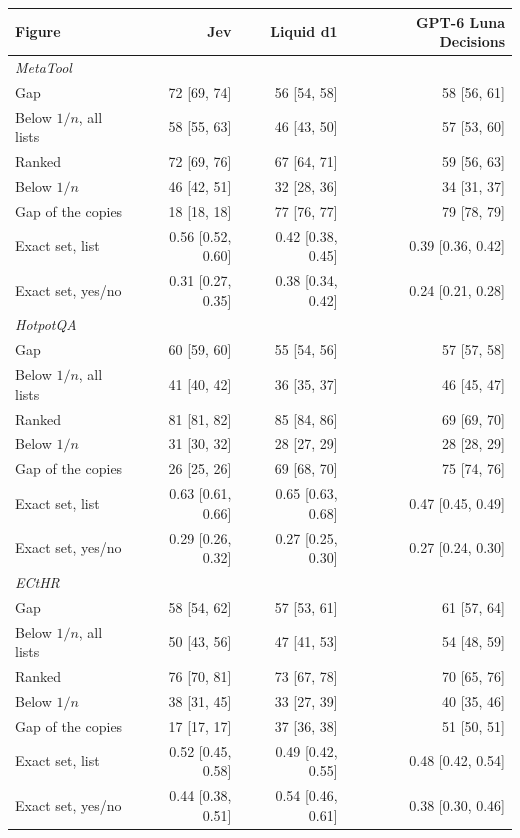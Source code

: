\begin{tabular}{lrrr}
\toprule
Figure & Jev & Liquid d1 & GPT-6 Luna Decisions \\
\midrule
\multicolumn{4}{l}{\emph{MetaTool}} \\
Gap & 72 [69, 74] & 56 [54, 58] & 58 [56, 61] \\
Below $1/n$, all lists & 58 [55, 63] & 46 [43, 50] & 57 [53, 60] \\
Ranked & 72 [69, 76] & 67 [64, 71] & 59 [56, 63] \\
Below $1/n$ & 46 [42, 51] & 32 [28, 36] & 34 [31, 37] \\
Gap of the copies & 18 [18, 18] & 77 [76, 77] & 79 [78, 79] \\
Exact set, list & 0.56 [0.52, 0.60] & 0.42 [0.38, 0.45] & 0.39 [0.36, 0.42] \\
Exact set, yes/no & 0.31 [0.27, 0.35] & 0.38 [0.34, 0.42] & 0.24 [0.21, 0.28] \\
\midrule
\multicolumn{4}{l}{\emph{HotpotQA}} \\
Gap & 60 [59, 60] & 55 [54, 56] & 57 [57, 58] \\
Below $1/n$, all lists & 41 [40, 42] & 36 [35, 37] & 46 [45, 47] \\
Ranked & 81 [81, 82] & 85 [84, 86] & 69 [69, 70] \\
Below $1/n$ & 31 [30, 32] & 28 [27, 29] & 28 [28, 29] \\
Gap of the copies & 26 [25, 26] & 69 [68, 70] & 75 [74, 76] \\
Exact set, list & 0.63 [0.61, 0.66] & 0.65 [0.63, 0.68] & 0.47 [0.45, 0.49] \\
Exact set, yes/no & 0.29 [0.26, 0.32] & 0.27 [0.25, 0.30] & 0.27 [0.24, 0.30] \\
\midrule
\multicolumn{4}{l}{\emph{ECtHR}} \\
Gap & 58 [54, 62] & 57 [53, 61] & 61 [57, 64] \\
Below $1/n$, all lists & 50 [43, 56] & 47 [41, 53] & 54 [48, 59] \\
Ranked & 76 [70, 81] & 73 [67, 78] & 70 [65, 76] \\
Below $1/n$ & 38 [31, 45] & 33 [27, 39] & 40 [35, 46] \\
Gap of the copies & 17 [17, 17] & 37 [36, 38] & 51 [50, 51] \\
Exact set, list & 0.52 [0.45, 0.58] & 0.49 [0.42, 0.55] & 0.48 [0.42, 0.54] \\
Exact set, yes/no & 0.44 [0.38, 0.51] & 0.54 [0.46, 0.61] & 0.38 [0.30, 0.46] \\
\bottomrule
\end{tabular}
